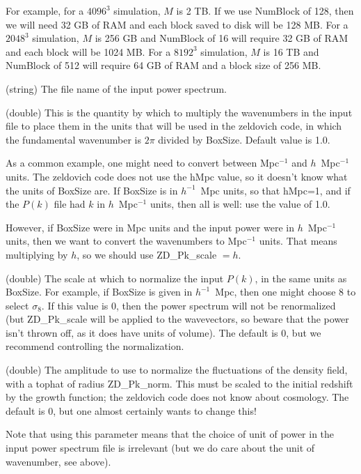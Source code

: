 \documentclass[11pt,preprint]{aastex}
\newcommand{\param}[2]{\medskip\noindent{\bf #1:} (#2) }
\begin{document}
For example, for a $4096^3$ simulation, $M$ is 2 TB.  If we use
NumBlock of 128, then we will need 32 GB of RAM and each block saved
to disk will be 128 MB.  For a $2048^3$ simulation, $M$ is 256 GB
and NumBlock of 16 will require 32 GB of RAM and each block will
be 1024 MB.  For a $8192^3$ simulation, $M$ is 16 TB and NumBlock
of 512 will require 64 GB of RAM and a block size of 256 MB.



\param{ZD\_Pk\_filename}{string} The file name of the input power spectrum.

\param{ZD\_Pk\_scale}{double} This is the quantity by which to multiply the 
wavenumbers in the input file to place them in the units that will be used
in the zeldovich code, in which the fundamental wavenumber is $2\pi$ divided
by BoxSize.  Default value is 1.0.

As a common example, one might need to convert between Mpc$^{-1}$ and
$h$~Mpc$^{-1}$ units.  The zeldovich code does not use the hMpc value,
so it doesn't know what the units of BoxSize are.  If BoxSize is in 
$h^{-1}$~Mpc units, so that hMpc=1, and if the $P(k)$ file had $k$
in $h$~Mpc$^{-1}$ units, then all is well: use the value of 1.0.

However, if BoxSize were in Mpc units and the input power were in 
$h$~Mpc$^{-1}$ units, then we want to convert the wavenumbers to 
Mpc$^{-1}$ units.  That means multiplying by $h$, so we should use
ZD\_Pk\_scale $=h$.

\param{ZD\_Pk\_norm}{double} The scale at which to normalize the input
$P(k)$, in the same units as BoxSize.  For example, if BoxSize is
given in $h^{-1}$~Mpc, then one might choose 8 to select $\sigma_8$.
If this value is 0, then the power spectrum will not be renormalized
(but ZD\_Pk\_scale will be applied to the wavevectors, so beware that
the power isn't thrown off, as it does have units of volume).  The
default is 0, but we recommend controlling the normalization.

\param{ZD\_Pk\_sigma}{double} The amplitude to use to normalize the
fluctuations of the density field, with a tophat of radius ZD\_Pk\_norm.
This must be scaled to the initial redshift by the growth function; 
the zeldovich code does not know about cosmology.  The default is 0,
but one almost certainly wants to change this!

Note that using this parameter means that the choice of unit of power 
in the input power spectrum file is irrelevant (but we do care about
the unit of wavenumber, see above).
\end{document}
